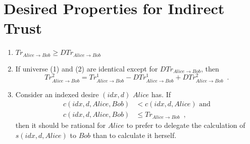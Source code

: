 \section{Desired Properties for Indirect Trust}
  \begin{enumerate}
    \item $Tr_{Alice \rightarrow Bob} \geq DTr_{Alice \rightarrow Bob}$
    \item If universe (1) and (2) are identical except for $DTr_{Alice \rightarrow Bob}$, then
      \begin{equation*}
	Tr^2_{Alice \rightarrow Bob} = Tr^1_{Alice \rightarrow Bob} - DTr^1_{Alice \rightarrow Bob} + DTr^2_{Alice \rightarrow
	Bob} \enspace.
      \end{equation*}
    \item Consider an indexed desire $\left(idx, d\right)$ $Alice$ has. If
    \begin{align*}
      c\left(idx, d, Alice, Bob\right) & < c\left(idx, d, Alice\right) \mbox{ and} \\
      c\left(idx, d, Alice, Bob\right) & \leq Tr_{Alice \rightarrow Bob} \enspace,
    \end{align*}
    then it should be rational for $Alice$ to prefer to delegate the calculation of $s\left(idx, d, Alice\right)$ to $Bob$ than
    to calculate it herself.
  \end{enumerate}
